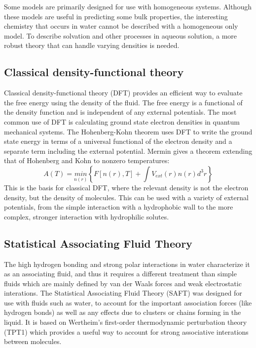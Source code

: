 \documentclass[letterpaper,twocolumn,amsmath,amssymb,prb]{revtex4-1}
\begin{document}
Some models are primarily designed for use with homogeneous systems. Although
these 
models are useful in predicting some bulk properties, the interesting
chemistry that occurs in water cannot be described with a homogeneous only
model. To
describe solvation and other processes in aqueous solution, a more robust theory
that 
can handle varying densities is needed.

\subsection{Classical density-functional theory}

Classical density-functional theory (DFT) provides an efficient way to evaluate
the free energy using the density of the fluid. The free energy is a functional
of the density function and is independent of any external
potentials\cite{ebner1976}. The most common use of DFT is calculating ground
state electron densities in quantum mechanical systems. The Hohenberg-Kohn
theorem\cite{hohenberg1964inhomogeneous} uses DFT to write the ground state
energy in terms of a universal functional of the electron density and a separate
term including the external potential. Mermin\cite{mermin1965thermal} gives a
theorem extending that of Hohenberg and Kohn to nonzero temperatures:
\begin{equation}
  A(T) = \underset{n(r)}{min}\left\{ F[n(r),T] + \int V_{ext}(r) n(r)
d^3r\right\}
\end{equation}
This is the basis for classical DFT, where the relevant density is not the
electron density,
but the density of molecules. This can be used with a variety of 
external potentials, from the simple interaction with a 
hydrophobic wall to the more complex, stronger interaction with hydrophilic
solutes.

\subsection{Statistical Associating Fluid Theory}

The high hydrogen bonding and strong polar interactions in water characterize it
as an associating fluid, and thus it requires a different treatment than simple
fluids which are mainly defined by van der Waals forces and weak electrostatic
interations. The Statistical Associating Fluid Theory (SAFT) was designed for
use with fluids such as water, to account for the important association forces
(like hydrogen bonds) as well as any effects due to clusters or chains forming
in the liquid\cite{muller2001molecular}. It is based on Wertheim's first-order
thermodynamic perturbation theory (TPT1)
\cite{wertheim1984fluidsI,wertheim1984fluidsII,wertheim1986fluidsIII,
wertheim1986fluidsIV} which provides a useful way to account for strong
associative interations between molecules.
\end{document}
